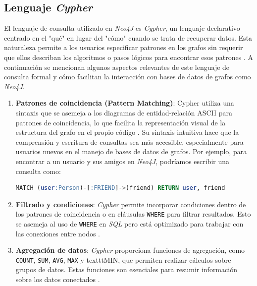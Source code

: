 \subsection{Lenguaje \textit{Cypher}} \label{cypher_language}

El lenguaje de consulta utilizado en \textit{Neo4J} es \textit{Cypher}, un lenguaje declarativo centrado en el "qué" en lugar del "cómo" cuando se trata de recuperar datos. Esta naturaleza permite a los usuarios especificar patrones en los grafos sin requerir que ellos describan los algoritmos o pasos lógicos para encontrar esos patrones \cite{neo4jdocs2022}. A continuación se mencionan algunos aspectos relevantes de este lenguaje de consulta formal y cómo facilitan la interacción con bases de datos de grafos como \textit{Neo4J}.

\begin{enumerate}

\item \textbf{Patrones de coincidencia (Pattern Matching)}:
Cypher utiliza una sintaxis que se asemeja a los diagramas de entidad-relación ASCII para patrones de coincidencia, lo que facilita la representación visual de la estructura del grafo en el propio código \cite{rodriguez2015}. Su sintaxis intuitiva hace que la comprensión y escritura de consultas sea más accesible, especialmente para usuarios nuevos en el manejo de bases de datos de grafos. Por ejemplo, para encontrar a un usuario y sus amigos en \textit{Neo4J}, podríamos escribir una consulta como:
\begin{center}
\begin{lstlisting}[language=sql, caption=Ejemplo de código \textit{Cypher}]
MATCH (user:Person)-[:FRIEND]->(friend) RETURN user, friend
\end{lstlisting}
\end{center}

\item \textbf{Filtrado y condiciones}: \textit{Cypher} permite incorporar condiciones dentro de los patrones de coincidencia o en cláusulas \texttt{WHERE} para filtrar resultados. Esto se asemeja al uso de \texttt{WHERE} en \textit{SQL} pero está optimizado para trabajar con las conexiones entre nodos \cite{webber2012}.

\item \textbf{Agregación de datos}: \textit{Cypher} proporciona funciones de agregación, como \texttt{COUNT}, \texttt{SUM}, \texttt{AVG}, \texttt{MAX} y texttt{MIN}, que permiten realizar cálculos sobre grupos de datos. Estas funciones son esenciales para resumir información sobre los datos conectados \cite{neo4jdocs2022}.


\end{enumerate}
